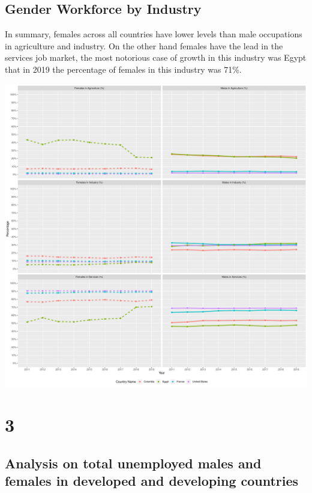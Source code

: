 \documentclass[
]{article}
\begin{document}
\hypertarget{gender-workforce-by-industry}{%
\subsection{Gender Workforce by
Industry}\label{gender-workforce-by-industry}}

In summary, females across all countries have lower levels than male
occupations in agriculture and industry. On the other hand females have
the lead in the services job market, the most notorious case of growth
in this industry was Egypt that in 2019 the percentage of females in
this industry was 71\%.

\includegraphics{The_Outsiders_5513_files/figure-latex/allvars-1.pdf}

\clearpage

\section*{3}

\hypertarget{analysis-on-total-unemployed-males-and-females-in-developed-and-developing-countries}{%
\subsection{Analysis on total unemployed males and females in developed
and developing
countries}\label{analysis-on-total-unemployed-males-and-females-in-developed-and-developing-countries}}
\end{document}
